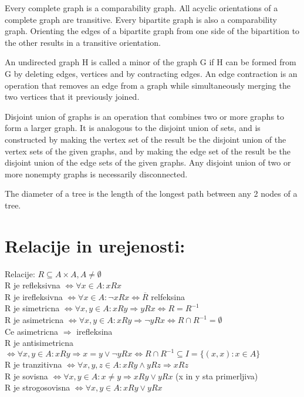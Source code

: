 \documentclass{article}
\begin{document}
Every complete graph is a comparability graph. All acyclic orientations of a complete graph are transitive. Every bipartite graph is also a comparability graph. Orienting the edges of a bipartite graph from one side of the bipartition to the other results in a transitive orientation.

An undirected graph H is called a minor of the graph G if H can be formed from G by deleting edges, vertices and by contracting edges. An edge contraction is an operation that removes an edge from a graph while simultaneously merging the two vertices that it previously joined.

Disjoint union of graphs is an operation that combines two or more graphs to form a larger graph. It is analogous to the disjoint union of sets, and is constructed by making the vertex set of the result be the disjoint union of the vertex sets of the given graphs, and by making the edge set of the result be the disjoint union of the edge sets of the given graphs. Any disjoint union of two or more nonempty graphs is necessarily disconnected.

The diameter of a tree is the length of the longest path between any 2 nodes of a tree. 

\section{ Relacije in urejenosti: }
Relacije: $ R\subseteq A\times A, A\neq\emptyset$ \\
R je refleksivna $\Leftrightarrow \forall x\in A: xRx$ \\
R je irefleksivna $\Leftrightarrow \forall x\in A: \neg xRx \Leftrightarrow \overline{R}$ relfeksina \\
R je simetricna $\Leftrightarrow \forall x,y\in A: xRy \Rightarrow yRx \Leftrightarrow R = R^{-1}$ \\
R je asimetricna $\Leftrightarrow \forall x,y\in A: xRy \Rightarrow \neg yRx \Leftrightarrow R \cap R^{-1} = \emptyset$ \\ Ce asimetricna $\Rightarrow$ irefleksina \\
R je antisimetricna $\Leftrightarrow \forall x,y\in A: xRy \Rightarrow x = y \lor \neg yRx \Leftrightarrow R \cap R^{-1} \subseteq I = \{ (x,x): x \in A\} $ \\
R je tranzitivna $\Leftrightarrow \forall x,y,z\in A: xRy \land yRz \Rightarrow xRz$ \\
R je sovisna $\Leftrightarrow \forall x,y\in A: x \neq y \Rightarrow xRy \lor yRx $ (x in y sta primerljiva)\\
R je strogosovisna $\Leftrightarrow \forall x,y\in A: xRy \lor yRx $\\
\end{document}
